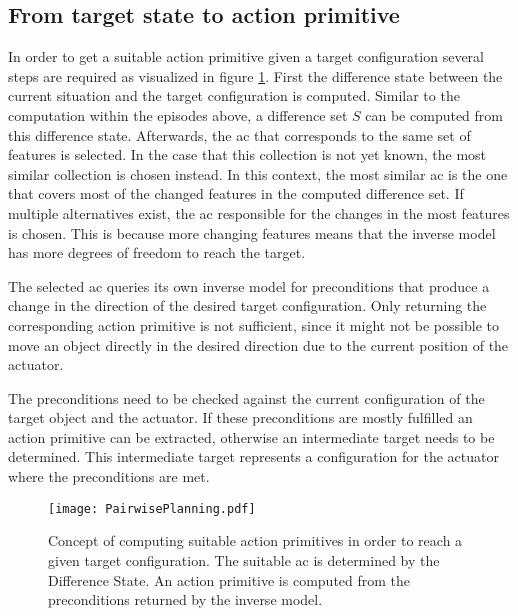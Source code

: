 \subsection{From target state to action primitive \label{sec:pairPlanning}}

In order to get a suitable action primitive given a target configuration several steps are required as visualized in figure \ref{fig:PairPlanning}. 
First the difference state between the current situation and the target configuration is computed. Similar to the computation within the episodes above, a difference set $S$ can be computed from this difference state. Afterwards, the \gls{ac} that corresponds to the same set of features is selected. In the case that this collection is not yet known, the most similar collection is chosen instead. In this context, the most similar \gls{ac} is the one that covers most of the changed features in the computed difference set. If multiple alternatives exist, the \gls{ac} responsible for the changes in the most features is chosen. This is because more changing features means that the inverse model has more degrees of freedom to reach the target.

The selected \gls{ac} queries its own inverse model for preconditions that produce a change in the direction of the desired target configuration. 
Only returning the corresponding action primitive is not sufficient, since it might not be possible to move an object directly in the desired direction due to the current position of the actuator.

The preconditions need to be checked against the current configuration of the target object and the actuator. If these preconditions are mostly fulfilled an action primitive can be extracted, otherwise an intermediate target needs to be determined. This intermediate target represents a configuration for the actuator where the preconditions are met.

\begin{figure}
	\centering
	\texttt{[image: PairwisePlanning.pdf]}
	\caption{Concept of computing suitable action primitives in order to reach a given target configuration. The suitable \gls{ac} is determined by the Difference State. An action primitive is computed from the preconditions returned by the inverse model.} 
	\label{fig:PairPlanning}
\end{figure}


